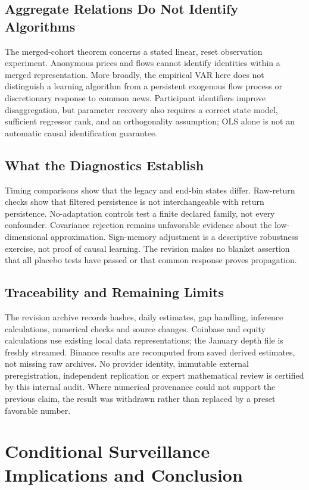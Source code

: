 \documentclass[12pt]{article}
\theoremstyle{definition}
\theoremstyle{remark}
\begin{document}
\subsection{Aggregate Relations Do Not Identify Algorithms}
The merged-cohort theorem concerns a stated linear, reset observation experiment. Anonymous prices and flows cannot identify identities within a merged representation. More broadly, the empirical VAR here does not distinguish a learning algorithm from a persistent exogenous flow process or discretionary response to common news. Participant identifiers improve disaggregation, but parameter recovery also requires a correct state model, sufficient regressor rank, and an orthogonality assumption; OLS alone is not an automatic causal identification guarantee.

\subsection{What the Diagnostics Establish}
Timing comparisons show that the legacy and end-bin states differ. Raw-return checks show that filtered persistence is not interchangeable with return persistence. No-adaptation controls test a finite declared family, not every confounder. Covariance rejection remains unfavorable evidence about the low-dimensional approximation. Sign-memory adjustment is a descriptive robustness exercise, not proof of causal learning. The revision makes no blanket assertion that all placebo tests have passed or that common response proves propagation.

\subsection{Traceability and Remaining Limits}
The revision archive records hashes, daily estimates, gap handling, inference calculations, numerical checks and source changes. Coinbase and equity calculations use existing local data representations; the January depth file is freshly streamed. Binance results are recomputed from saved derived estimates, not missing raw archives. No provider identity, immutable external preregistration, independent replication or expert mathematical review is certified by this internal audit. Where numerical provenance could not support the previous claim, the result was withdrawn rather than replaced by a preset favorable number.

\section{Conditional Surveillance Implications and Conclusion}
\label{sec:policy_conclusion}
\end{document}

